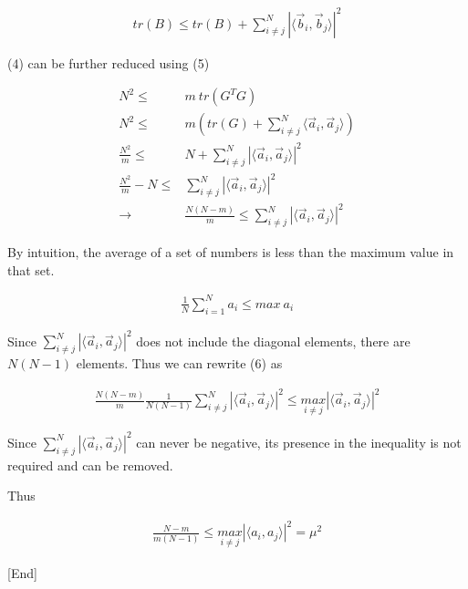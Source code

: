 \documentclass[11pt]{article}
\begin{document}
\begin{equation}
\begin{split}
tr(B) \leq tr(B) + \sum_{i \neq j}^{N} | \langle \vec b_i, \vec b_j \rangle|^2
\end{split}
\end{equation}

(4) can be further reduced using (5)

\begin{equation}
\begin{split}
N^2 \leq & m \ tr(G^T G)\\
N^2 \leq & m (tr(G) + \sum_{i \neq j}^{N} \langle \vec a_i, \vec a_j \rangle)\\
\frac{N^2}{m} \leq & N + \sum_{i \neq j}^{N} |\langle \vec a_i, \vec a_j \rangle|^2\\
\frac{N^2}{m} - N \leq & \sum_{i \neq j}^{N} | \langle \vec a_i, \vec a_j \rangle |^2\\
\to & \frac{N(N - m)}{m} \leq \sum_{i \neq j}^{N} | \langle \vec a_i, \vec a_j \rangle |^2
\end{split}
\end{equation}

By intuition, the average of a set of numbers is less than the maximum value in
that set.

\begin{equation}
\begin{split}
\frac{1}{N} \sum_{i = 1}^{N} a_i \leq {max} \ a_i
\end{split}
\end{equation}

Since \(\sum_{i \neq j}^{N} |\langle \vec a_i, \vec a_j \rangle |^2\) does not include the diagonal
elements, there are \(N(N - 1)\) elements. Thus we can rewrite (6) as

\begin{equation}
\begin{split}
\frac{N(N - m)}{m} \frac{1}{N(N - 1)} \sum_{i \neq j}^{N} | \langle \vec a_i, \vec a_j \rangle |^2 \leq \underset{i \neq j}{max} | \langle \vec a_i, \vec a_j \rangle |^2
\end{split}
\end{equation}

Since \(\sum_{i \neq j}^{N} |\langle \vec a_i, \vec a_j \rangle|^2\) can never be negative,
its presence in the inequality is not required and can be removed.

Thus

\begin{equation}
\begin{split}
\frac{N - m}{m(N - 1)} \leq \underset{i \neq j}{max} |\langle a_i, a_j \rangle|^2 = \mu^2
\end{split}
\end{equation}

[End]
\end{document}
